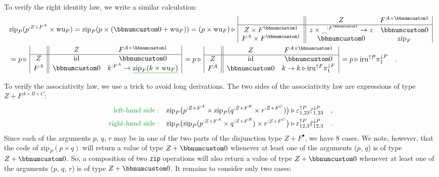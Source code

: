 To verify the right identity law, we write a similar calculation:
\begin{align*}
 & \text{zip}_{P}(p^{:Z+F^{A}}\times\text{wu}_{P})=\text{zip}_{P}(p\times(\bbnum 0+\text{wu}_{F}))=(p\times\text{wu}_{F})\triangleright\,\begin{array}{|c||cc|}
 & Z & F^{A\times\bbnum 1}\\
\hline Z\times F^{\bbnum 1} & z\times\_^{:F^{\bbnum 1}}\rightarrow z & \bbnum 0\\
F^{A}\times F^{\bbnum 1} & \bbnum 0 & \text{zip}_{F}
\end{array}\\
 & =p\triangleright\,\begin{array}{|c||cc|}
 & Z & F^{A\times\bbnum 1}\\
\hline Z & \text{id} & \bbnum 0\\
F^{A} & \bbnum 0 & k^{:F^{A}}\rightarrow\gunderline{\text{zip}_{F}(k\times\text{wu}_{F})}
\end{array}\,=p\triangleright\,\begin{array}{|c||cc|}
 & Z & F^{A\times\bbnum 1}\\
\hline Z & \text{id} & \bbnum 0\\
F^{A} & \bbnum 0 & k\rightarrow k\triangleright\text{iru}^{\uparrow F}\pi_{1}^{\downarrow F}
\end{array}\,=p\triangleright\text{iru}^{\uparrow P}\pi_{1}^{\downarrow P}\quad.
\end{align*}

To verify the associativity law, we use a trick to avoid long derivations.
The two sides of the associativity law are expressions of type $Z+F^{A\times B\times C}$:
\begin{align*}
{\color{greenunder}\text{left-hand side}:}\quad & \text{zip}_{P}\big(p^{:Z+F^{A}}\times\text{zip}_{P}(q^{:Z+F^{B}}\times r^{:Z+F^{C}})\big)\triangleright\varepsilon_{1,23}^{\uparrow P}\tilde{\varepsilon}_{1,23}^{\downarrow P}\quad,\\
{\color{greenunder}\text{right-hand side}:}\quad & \text{zip}_{P}\big(\text{zip}_{P}(p^{:Z+F^{A}}\times q^{:Z+F^{B}})\times r^{:Z+F^{C}}\big)\triangleright\varepsilon_{12,3}^{\uparrow P}\tilde{\varepsilon}_{12,3}^{\downarrow P}\quad.
\end{align*}
Since each of the arguments $p$, $q$, $r$ may be in one of the
two parts of the disjunction type $Z+F^{\bullet}$, we have 8 cases.
We note, however, that the code of $\text{zip}_{P}(p\times q)$ will
return a value of type $Z+\bbnum 0$ whenever at least one of the
arguments ($p$, $q$) is of type $Z+\bbnum 0$. So, a composition
of two \lstinline!zip! operations will also return a value of type
$Z+\bbnum 0$ whenever at least one of the arguments ($p$, $q$,
$r$) is of type $Z+\bbnum 0$. It remains to consider only two cases: 

